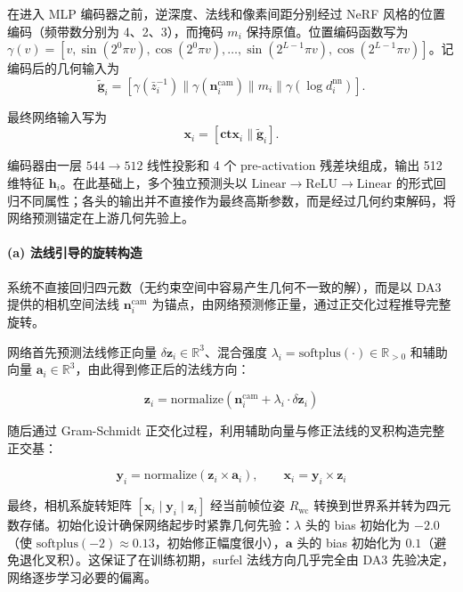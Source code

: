 在进入 MLP 编码器之前，逆深度、法线和像素间距分别经过 NeRF 风格的位置编码（频带数分别为 4、2、3），而掩码 $m_i$ 保持原值。位置编码函数写为 $\gamma(v) = [v, \sin(2^0 \pi v), \cos(2^0 \pi v), \ldots, \sin(2^{L-1} \pi v), \cos(2^{L-1} \pi v)]$。记编码后的几何输入为
\begin{equation}
\tilde{\mathbf{g}}_i =
[\gamma(\bar{z}_i^{-1}) \| \gamma(\mathbf{n}_i^{\text{cam}}) \| m_i \| \gamma(\log d_i^{\text{nn}})].
\end{equation}

最终网络输入写为
\begin{equation}
\mathbf{x}_i = [\mathbf{ctx}_i \| \tilde{\mathbf{g}}_i].
\end{equation}

编码器由一层 $544 \to 512$ 线性投影和 4 个 pre-activation 残差块组成，输出 512 维特征 $\mathbf{h}_i$。在此基础上，多个独立预测头以 $\text{Linear} \to \text{ReLU} \to \text{Linear}$ 的形式回归不同属性；各头的输出并不直接作为最终高斯参数，而是经过几何约束解码，将网络预测锚定在上游几何先验上。

\paragraph{(a) 法线引导的旋转构造}

系统不直接回归四元数（无约束空间中容易产生几何不一致的解），而是以 DA3 提供的相机空间法线 $\mathbf{n}_i^{\text{cam}}$ 为锚点，由网络预测修正量，通过正交化过程推导完整旋转。

网络首先预测法线修正向量 $\delta \mathbf{z}_i \in \mathbb{R}^3$、混合强度 $\lambda_i = \text{softplus}(\cdot) \in \mathbb{R}_{>0}$ 和辅助向量 $\mathbf{a}_i \in \mathbb{R}^3$，由此得到修正后的法线方向：

\begin{equation}
\mathbf{z}_i = \text{normalize}(\mathbf{n}_i^{\text{cam}} + \lambda_i \cdot \delta \mathbf{z}_i)
\end{equation}

随后通过 Gram-Schmidt 正交化过程，利用辅助向量与修正法线的叉积构造完整正交基：

\begin{equation}
\mathbf{y}_i = \text{normalize}(\mathbf{z}_i \times \mathbf{a}_i), \qquad \mathbf{x}_i = \mathbf{y}_i \times \mathbf{z}_i
\end{equation}

最终，相机系旋转矩阵 $[\mathbf{x}_i \mid \mathbf{y}_i \mid \mathbf{z}_i]$ 经当前帧位姿 $R_{\text{wc}}$ 转换到世界系并转为四元数存储。初始化设计确保网络起步时紧靠几何先验：$\lambda$ 头的 bias 初始化为 $-2.0$（使 $\text{softplus}(-2) \approx 0.13$，初始修正幅度很小），$\mathbf{a}$ 头的 bias 初始化为 $0.1$（避免退化叉积）。这保证了在训练初期，surfel 法线方向几乎完全由 DA3 先验决定，网络逐步学习必要的偏离。


